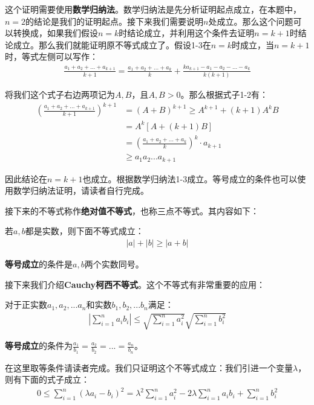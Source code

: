 \documentclass{ctexart}
\let\oldtextbf\textbf %
\renewcommand{\textbf}[1]{\textcolor{btex}{\oldtextbf{#1}}} %
\begin{document}
这个证明需要使用\textbf{\color{btex}数学归纳法}。数学归纳法是先分析证明起点成立，在本题中，$n=2$的结论是我们的证明起点。接下来我们需要说明$n$处成立。那么这个问题可以转换成，如果我们假设$n=k$时结论成立，并利用这个条件去证明$n=k+1$时结论成立。那么我们就能证明原不等式成立了。假设1-3在$n=k$时成立，当$n=k+1$时，等式左侧可以写作：
\begin{align*}
    \frac{a_1+a_2+...+a_{k+1}}{k+1}=\frac{a_1+a_2+...+a_k}{k}+\frac{ka_{k+1}-a_1-a_2-...-a_k}{k(k+1)}
\end{align*}

将我们这个式子右边两项记为$A,B$，且$A,B>0$。那么根据式子1-2有：
\begin{align*}
    \left(\frac{a_1+a_2+...+a_{k+1}}{k+1}\right)^{k+1}&=(A+B)^{k+1}\geq A^{k+1}+(k+1)A^kB\\
    &=A^k[A+(k+1)B]\\
    &=\left(\frac{a_1+a_2+...+a_k}{k}\right)^{k}\cdot a_{k+1}\\
    &\geq a_1a_2...a_{k+1}
\end{align*}

因此结论在$n=k+1$也成立。根据数学归纳法1-3成立。等号成立的条件也可以使用数学归纳法证明，请读者自行完成。

接下来的不等式称作\textbf{\color{btex}绝对值不等式}，也称三点不等式。其内容如下：
\begin{tcolorbox}[
    colback=bac2,     %
    colframe=fra2,   %
    coltitle=white,             %
    coltext=tex2,
    title=绝对值不等式,
    fonttitle=\bfseries,        %
arc=3mm,                     %
breakable
]

若$a,b$都是实数，则下面不等式成立：
\begin{align*}
    |a|+|b|\geq |a+b|\tag{1-4}
\end{align*}

\textbf{等号成立}的条件是$a,b$两个实数同号。
\end{tcolorbox}

接下来我们介绍\textbf{\color{btex}Cauchy柯西不等式}。这个不等式有非常重要的应用：
\begin{tcolorbox}[
    colback=bac1,     %
    colframe=fra1,   %
    coltitle=white,             %
    coltext=tex1,
    title=Cauchy柯西不等式,
    fonttitle=\bfseries,        %
arc=3mm,                     %
breakable
]
对于正实数$a_1,a_2,...a_n$和实数$b_1,b_2,...b_n$满足：
\begin{align*}
    \left|\sum_{i=1}^n a_ib_i\right|\leq \sqrt{\sum_{i=1}^n a_i^2}\sqrt{\sum_{i=1}^n b_i^2}\tag{1-5}
\end{align*}

\textbf{等号成立}的条件为$\frac{a_1}{b_1}=\frac{a_2}{b_2}=...=\frac{a_n}{b_n}$。
\end{tcolorbox}
在这里取等条件请读者完成。我们只证明这个不等式成立：我们引进一个变量$\lambda$，则有下面的式子成立：
\begin{align*}
    0\leq \sum_{i=1}^n(\lambda a_i-b_i)^2=\lambda^2\sum_{i=1}^n a_i^2-2\lambda\sum_{i=1}^n a_ib_i
+\sum_{i=1}^n b_i^2
\end{align*}
\end{document}
